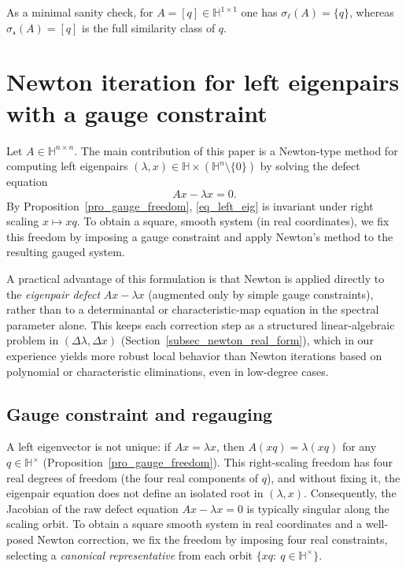 \documentclass[preprint,12pt]{elsarticle}  %
\theoremstyle{definition}
\theoremstyle{definition}
\theoremstyle{definition}
\theoremstyle{definition}
\theoremstyle{definition}
\theoremstyle{remark}
\theoremstyle{remark}
\theoremstyle{remark}
\newcommand{\err}{\ensuremath{ \mathscr{r} }}
\newcommand{\HH}{\mathbb{H}}
\begin{document}
As a minimal sanity check, for $A=[q]\in\HH^{1\times 1}$ one has $\sigma_\ell(A)=\{q\}$, whereas
$\sigma_\err(A)=[q]$ is the full similarity class of $q$.
\label{ex_left_right_1x1}

\section{Newton iteration for left eigenpairs with a gauge constraint}
\label{sec_newton_left_eigs}
Let $A\in\HH^{n\times n}$. The main contribution of this paper is a Newton-type method for computing left eigenpairs
$(\lambda,x)\in\HH\times(\HH^n\setminus\{0\})$ by solving the defect equation
\begin{equation}
\label{eq_left_eig}
Ax-\lambda x = 0.
\end{equation}
By Proposition~\ref{pro_gauge_freedom}, \eqref{eq_left_eig} is invariant under right scaling $x\mapsto xq$.
To obtain a square, smooth system (in real coordinates), we fix this freedom by imposing a gauge constraint and apply Newton's method to the resulting gauged system.

A practical advantage of this formulation is that Newton is applied directly to the \emph{eigenpair defect}
$Ax-\lambda x$ (augmented only by simple gauge constraints), rather than to a determinantal or characteristic-map equation in the spectral parameter alone. This keeps each correction step as a structured linear-algebraic problem in
$(\Delta\lambda,\Delta x)$ (Section~\ref{subsec_newton_real_form}), which in our experience yields more robust local behavior than Newton iterations based on polynomial or characteristic eliminations, even in low-degree cases.

\subsection{Gauge constraint and regauging}
\label{subsec_newton_gauge}
A left eigenvector is not unique: if $Ax=\lambda x$, then $A(xq)=\lambda(xq)$ for any $q\in\HH^\times$ (Proposition~\ref{pro_gauge_freedom}). This right-scaling freedom has four real degrees of freedom (the four real components
of $q$), and without fixing it, the eigenpair equation does not define an isolated root in $(\lambda,x)$.
Consequently, the Jacobian of the raw defect equation $Ax-\lambda x=0$ is typically singular along the scaling orbit.
To obtain a square smooth system in real coordinates and a well-posed Newton correction, we fix the freedom by imposing four real constraints, selecting a \emph{canonical representative} from each orbit $\{xq:\ q\in\HH^\times\}$.
\end{document}
